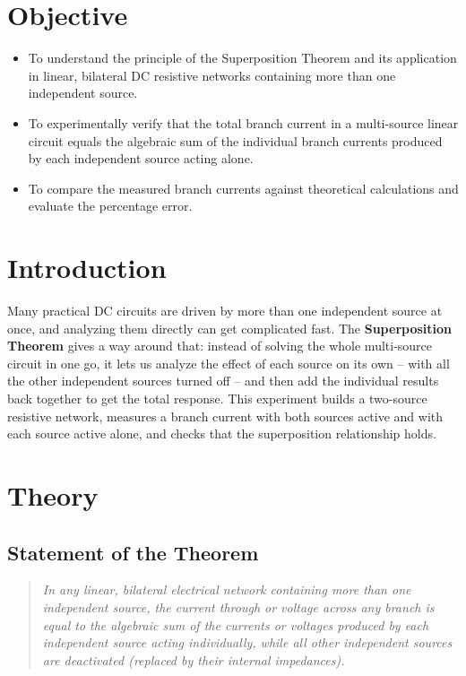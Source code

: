 

\section{Objective}
\begin{itemize}
    \item To understand the principle of the Superposition Theorem and its application in linear, bilateral DC resistive networks containing more than one independent source.
    \item To experimentally verify that the total branch current in a multi-source linear circuit equals the algebraic sum of the individual branch currents produced by each independent source acting alone.
    \item To compare the measured branch currents against theoretical calculations and evaluate the percentage error.
\end{itemize}

\section{Introduction}
Many practical DC circuits are driven by more than one independent source at once, and analyzing them directly can get complicated fast. The \textbf{Superposition Theorem} gives a way around that: instead of solving the whole multi-source circuit in one go, it lets us analyze the effect of each source on its own -- with all the other independent sources turned off -- and then add the individual results back together to get the total response. This experiment builds a two-source resistive network, measures a branch current with both sources active and with each source active alone, and checks that the superposition relationship holds.

\section{Theory}

\subsection{Statement of the Theorem}
\begin{quote}
    \textit{In any linear, bilateral electrical network containing more than one independent source, the current through or voltage across any branch is equal to the algebraic sum of the currents or voltages produced by each independent source acting individually, while all other independent sources are deactivated (replaced by their internal impedances).}
\end{quote}

